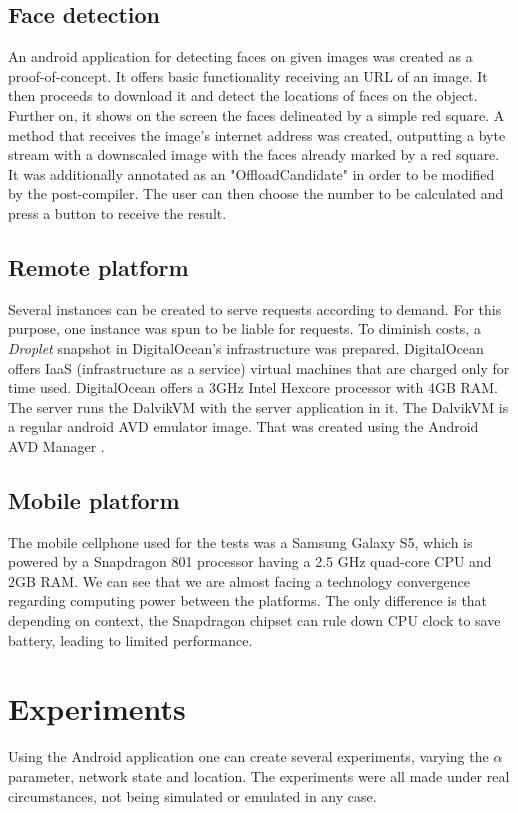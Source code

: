 \documentclass[10pt, conference, letterpaper]{IEEEtran}
\begin{document}
  \subsection{Face detection}
  An android application for detecting faces on given images was created as a proof-of-concept. It offers basic functionality receiving an URL of an image. It then proceeds to download it and detect the locations of faces on the object. Further on, it shows on the screen the faces delineated by a simple red square. A method that receives the image's internet address was created, outputting a byte stream with a downscaled image with the faces already marked by a red square. It was additionally annotated as an "OffloadCandidate" in order to be modified by the post-compiler. The user can then choose the number to be calculated and press a button to receive the result.

  \subsection{Remote platform}
  Several instances can be created to serve requests according to demand. For this purpose, one instance was spun to be liable for requests. To diminish costs, a \textit{Droplet} snapshot in DigitalOcean's infrastructure \cite{digitalocean} was prepared. DigitalOcean offers IaaS (infrastructure as a service) virtual machines that are charged only for time used. DigitalOcean offers a 3GHz Intel Hexcore processor with 4GB RAM. The server runs the DalvikVM with the server application in it. The DalvikVM is a regular android AVD emulator image. That was created using the Android AVD Manager \cite{androidavd}.

  \subsection{Mobile platform}
  The mobile cellphone used for the tests was a Samsung Galaxy S5, which is powered by a Snapdragon 801 processor having a 2.5 GHz quad-core CPU and 2GB RAM. We can see that we are almost facing a technology convergence regarding computing power between the platforms. The only difference is that depending on context, the Snapdragon chipset can rule down CPU clock to save battery, leading to limited performance.

  \section{Experiments}
  Using the Android application one can create several experiments, varying the $\alpha$ parameter, network state and location. The experiments were all made under real circumstances, not being simulated or emulated in any case.
\end{document}

